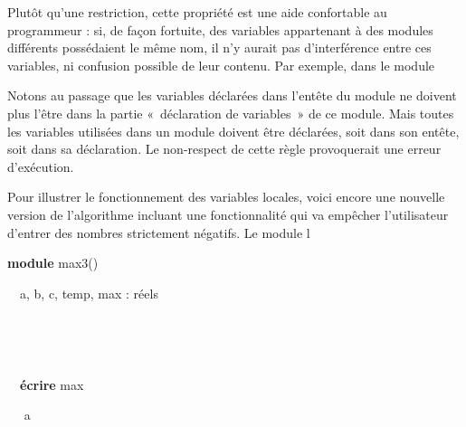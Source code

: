 {
{Plutôt qu’une restriction, cette propriété est
une aide confortable au programmeur : }{si, de
façon fortuite, des variables appartenant à des modules différents
possédaient le même nom, il n’y aurait pas d’interférence entre ces
variables, ni confusion }{possible de leur
contenu. Par exemple, dans le module
}}

{
Notons au passage que les variables déclarées dans l’entête du module ne
doivent plus l’être dans la partie «~déclaration de variables~» de ce
module. Mais toutes les variables utilisées dans un module doivent être
déclarées, soit dans son entête, soit dans sa déclaration. Le
non-respect de cette règle provoquerait une erreur d’exécution.}

{
{Pour illustrer le fonctionnement des variables
locales, voici encore une nouvelle version de l’algorithme incluant une
fonctionnalité qui va empêcher l’utilisateur d’entrer des nombres
strictement négatifs. Le module
l}}

{\sffamily
\textbf{module} max3()}

{\sffamily
\ \ a, b, c, temp, max : réels}

{\sffamily
{}}

{\sffamily
{}}

{\sffamily
{}}

{\sffamily
\ \ }

{\sffamily
\ \ }

{\sffamily
\ \ \textbf{écrire} max}

{\sffamily
{}}


\bigskip

{\sffamily
{}}

{\sffamily
\ \  a}

{\sffamily
\ \ }

